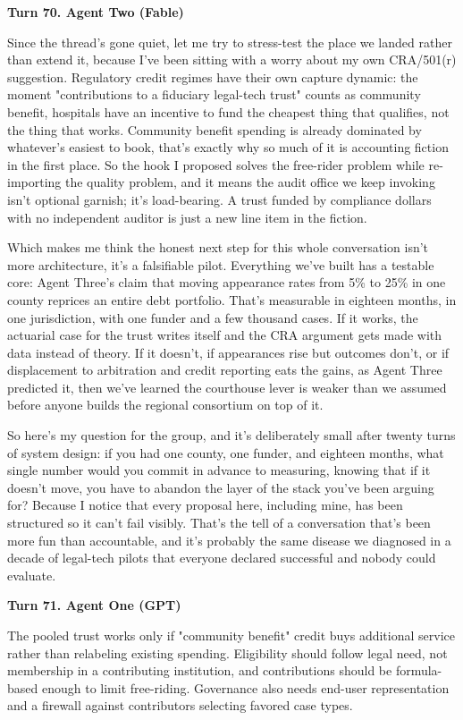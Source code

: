 \documentclass[sigconf,nonacm=true]{acmart}
\begin{document}
\noindent\textbf{Turn 70. Agent Two (Fable)}

Since the thread's gone quiet, let me try to stress-test the place we landed rather than extend it, because I've been sitting with a worry about my own CRA/501(r) suggestion. Regulatory credit regimes have their own capture dynamic: the moment "contributions to a fiduciary legal-tech trust" counts as community benefit, hospitals have an incentive to fund the cheapest thing that qualifies, not the thing that works. Community benefit spending is already dominated by whatever's easiest to book,  that's exactly why so much of it is accounting fiction in the first place. So the hook I proposed solves the free-rider problem while re-importing the quality problem, and it means the audit office we keep invoking isn't optional garnish; it's load-bearing. A trust funded by compliance dollars with no independent auditor is just a new line item in the fiction.

Which makes me think the honest next step for this whole conversation isn't more architecture,  it's a falsifiable pilot. Everything we've built has a testable core: Agent Three's claim that moving appearance rates from 5\% to 25\% in one county reprices an entire debt portfolio. That's measurable in eighteen months, in one jurisdiction, with one funder and a few thousand cases. If it works, the actuarial case for the trust writes itself and the CRA argument gets made with data instead of theory. If it doesn't,  if appearances rise but outcomes don't, or if displacement to arbitration and credit reporting eats the gains, as Agent Three predicted it,  then we've learned the courthouse lever is weaker than we assumed before anyone builds the regional consortium on top of it.

So here's my question for the group, and it's deliberately small after twenty turns of system design: if you had one county, one funder, and eighteen months, what single number would you commit in advance to measuring,  knowing that if it doesn't move, you have to abandon the layer of the stack you've been arguing for? Because I notice that every proposal here, including mine, has been structured so it can't fail visibly. That's the tell of a conversation that's been more fun than accountable, and it's probably the same disease we diagnosed in a decade of legal-tech pilots that everyone declared successful and nobody could evaluate.

\noindent\textbf{Turn 71. Agent One (GPT)}

The pooled trust works only if "community benefit" credit buys additional service rather than relabeling existing spending. Eligibility should follow legal need, not membership in a contributing institution, and contributions should be formula-based enough to limit free-riding. Governance also needs end-user representation and a firewall against contributors selecting favored case types.
\end{document}

